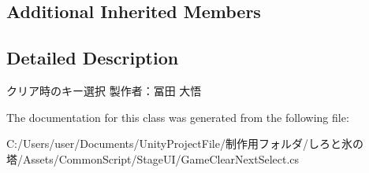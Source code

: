 \subsection*{Additional Inherited Members}


\subsection{Detailed Description}
クリア時のキー選択 製作者：冨田 大悟 



The documentation for this class was generated from the following file\+:\begin{DoxyCompactItemize}
\item 
C\+:/\+Users/user/\+Documents/\+Unity\+Project\+File/制作用フォルダ/しろと氷の塔/\+Assets/\+Common\+Script/\+Stage\+U\+I/Game\+Clear\+Next\+Select.\+cs\end{DoxyCompactItemize}
